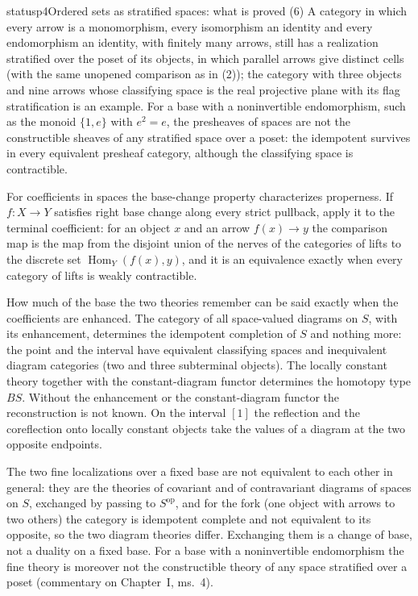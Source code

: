 \begin{dcomment}{status}{p4}{Ordered sets as stratified spaces: what is proved}
(6) A category in which every arrow is a monomorphism, every isomorphism an identity and every endomorphism an identity, with finitely many arrows, still has a realization stratified over the poset of its objects, in which parallel arrows give distinct cells (with the same unopened comparison as in (2)); the category with three objects and nine arrows whose classifying space is the real projective plane with its flag stratification is an example. For a base with a noninvertible endomorphism, such as the monoid $\{1,e\}$ with $e^2=e$, the presheaves of spaces are not the constructible sheaves of any stratified space over a poset: the idempotent survives in every equivalent presheaf category, although the classifying space is contractible.
\end{dcomment}

For coefficients in spaces the base-change property characterizes properness. If $f:X\to Y$ satisfies right base change along every strict pullback, apply it to the terminal coefficient: for an object $x$ and an arrow $f(x)\to y$ the comparison map is the map from the disjoint union of the nerves of the categories of lifts to the discrete set $\operatorname{Hom}_Y(f(x),y)$, and it is an equivalence exactly when every category of lifts is weakly contractible.

How much of the base the two theories remember can be said exactly when the coefficients are enhanced. The category of all space-valued diagrams on $S$, with its enhancement, determines the idempotent completion of $S$ and nothing more: the point and the interval have equivalent classifying spaces and inequivalent diagram categories (two and three subterminal objects). The locally constant theory together with the constant-diagram functor determines the homotopy type $BS$. Without the enhancement or the constant-diagram functor the reconstruction is not known. On the interval $[1]$ the reflection and the coreflection onto locally constant objects take the values of a diagram at the two opposite endpoints.

The two fine localizations over a fixed base are not equivalent to each other in general: they are the theories of covariant and of contravariant diagrams of spaces on $S$, exchanged by passing to $S^{\mathrm{op}}$, and for the fork (one object with arrows to two others) the category is idempotent complete and not equivalent to its opposite, so the two diagram theories differ. Exchanging them is a change of base, not a duality on a fixed base. For a base with a noninvertible endomorphism the fine theory is moreover not the constructible theory of any space stratified over a poset (commentary on Chapter~I, ms.~4).

